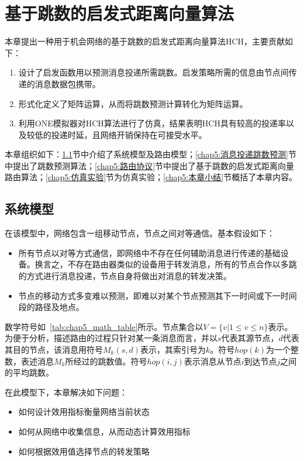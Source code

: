 \chapter{基于跳数的启发式距离向量算法}
\label{chap:基于跳数的启发式距离向量算法}

本章提出一种用于机会网络的基于跳数的启发式距离向量算法HCH，主要贡献如下：

\begin{enumerate}
\item 设计了启发函数用以预测消息投递所需跳数。启发策略所需的信息由节点间传递的消息数据包携带。
\item 形式化定义了矩阵运算，从而将跳数预测计算转化为矩阵运算。
\item 利用ONE模拟器对HCH算法进行了仿真，结果表明HCH具有较高的投递率以及较低的投递时延，且网络开销保持在可接受水平。
\end{enumerate}

本章组织如下：\ref{chap5:系统模型}节中介绍了系统模型及路由模型；\ref{chap5:消息投递跳数预测}节中提出了跳数预测算法；\ref{chap5:路由协议}节中提出了基于跳数的启发式距离向量路由算法；\ref{chap5:仿真实验}节为仿真实验；\ref{chap5:本章小结}节概括了本章内容。


\section{系统模型}
\label{chap5:系统模型}

在该模型中，网络包含一组移动节点，节点之间对等通信。基本假设如下：
\begin{itemize}
\item 所有节点以对等方式通信，即网络中不存在任何辅助消息进行传递的基础设备。换言之，不存在路由器类似的设备用于转发消息，所有的节点合作以多跳的方式进行消息投递，节点自身将做出对消息的转发决策。
\item 节点的移动方式多变难以预测，即难以对某个节点预测其下一时间或下一时间段的路径及地点。
\end{itemize}

数学符号如\tablename~\ref{tab:chap5_math_table}所示。节点集合以$V=\{v|1\leq v\leq n\}$表示。为便于分析，描述路由的过程只针对某一条消息而言，并以$s$代表其源节点，$d$代表其目的节点，该消息用符号$M_k(s,d)$表示，其索引号为$k$。符号$hop(k)$为一个整数，表述消息$M_k$所经过的跳数值。符号$\overline{hop}(i,j)$表示消息从节点$i$到达节点$j$之间的平均跳数。

在此模型下，本章解决如下问题：
\begin{itemize}
\item 如何设计效用指标衡量网络当前状态
\item 如何从网络中收集信息，从而动态计算效用指标
\item 如何根据效用值选择节点的转发策略
\end{itemize}



